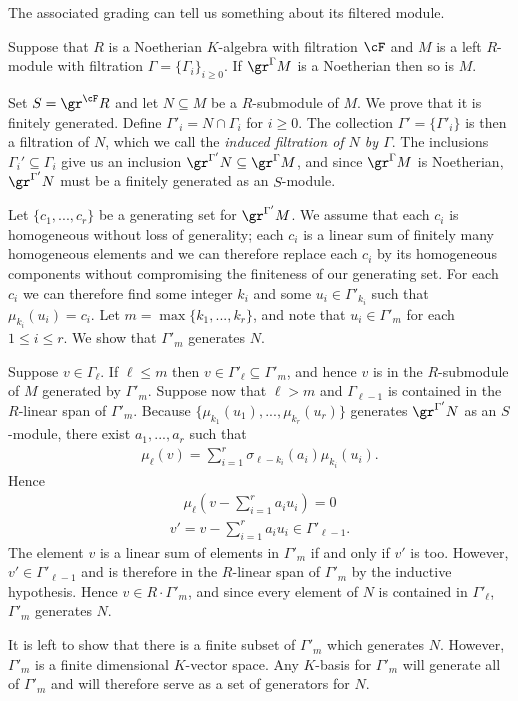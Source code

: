 The associated grading can tell us something about its filtered module.
\begin{thm}\label{thm:noeth-assoc-graded-module}
	Suppose that $R$ is a Noetherian $K$-algebra with filtration $\cF$ and $M$ is a left $R$-module with filtration $\Gamma = \{\Gamma_i\}_{i\geq 0}$. If $\gr^\Gamma M$ is a Noetherian then so is $M$.
\end{thm}
\begin{prf}
	Set $S = \gr^\cF R$ and let $N \subseteq M$ be a $R$-submodule of $M$. We prove that it is finitely generated. Define $\Gamma'_i = N \cap \Gamma_i$ for $i \geq 0$. The collection $\Gamma' = \{\Gamma'_i\}$ is then a filtration of $N$, which we call the \emph{induced filtration of $N$ by $\Gamma$}. The inclusions $\Gamma_i' \subseteq \Gamma_i$ give us an inclusion $\gr^{\Gamma'} N \subseteq \gr^\Gamma M$, and since $\gr^\Gamma M$ is Noetherian, $\gr^{\Gamma'}N$ must be a finitely generated as an $S$-module.

	Let $\{c_1,...,c_r\}$ be a generating set for $\gr^{\Gamma'}M$. We assume that each $c_i$ is homogeneous without loss of generality; each $c_i$ is a linear sum of finitely many homogeneous elements and we can therefore replace each $c_i$ by its homogeneous components without compromising the finiteness of our generating set. For each $c_i$ we can therefore find some integer $k_i$ and some $u_i \in \Gamma'_{k_i}$ such that $\mu_{k_i}(u_i) = c_i$. Let $m = \max\{k_1,...,k_r\}$, and note that $u_i \in \Gamma'_m$ for each $1\leq i\leq r$. We show that $\Gamma'_m$ generates $N$.

    Suppose $v \in \Gamma_\ell$. If $\ell \leq m$ then $v \in \Gamma'_\ell \subseteq \Gamma'_m$, and hence $v$ is in the $R$-submodule of $M$ generated by $\Gamma'_m$. Suppose now that $\ell > m$ and $\Gamma_{\ell - 1}$ is contained in the $R$-linear span of $\Gamma'_m$. Because $\{\mu_{k_1}(u_1),...,\mu_{k_r}(u_r)\}$ generates $\gr^{\Gamma'}N$ as an $S$-module, there exist $a_1,...,a_r$ such that
	\begin{align*}
		\mu_\ell(v) = \sum_{i=1}^r \sigma_{\ell-k_i}(a_i)\mu_{k_i}(u_i).
	\end{align*}
	Hence
	\begin{align*}
		\mu_\ell \left(v - \sum_{i=1}^r a_i u_i\right) = 0
	\end{align*}
	\begin{align*}
		v' = v - \sum_{i=1}^r a_i u_i \in \Gamma'_{\ell - 1}.
	\end{align*}
	The element $v$ is a linear sum of elements in $\Gamma'_m$ if and only if $v'$ is too. However, $v' \in \Gamma'_{\ell - 1}$ and is therefore in the $R$-linear span of $\Gamma'_{m}$ by the inductive hypothesis. Hence $v \in R\cdot \Gamma'_m$, and since every element of $N$ is contained in $\Gamma'_\ell$, $\Gamma'_m$ generates $N$.

	It is left to show that there is a finite subset of $\Gamma'_m$ which generates $N$. However, $\Gamma'_m$ is a finite dimensional $K$-vector space. Any $K$-basis for $\Gamma'_m$ will generate all of $\Gamma'_m$ and will therefore serve as a set of generators for $N$.
\end{prf}
